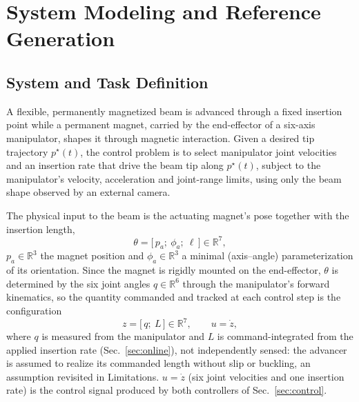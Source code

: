 \documentclass[journal]{IEEEtran}
\begin{document}
\section{System Modeling and Reference Generation}
\label{sec:system}

\subsection{System and Task Definition}
\label{sec:problem}

A flexible, permanently magnetized beam is advanced through a fixed
insertion point while a permanent magnet, carried by the end-effector of a
six-axis manipulator, shapes it through magnetic interaction. Given a
desired tip trajectory $p^\star(t)$, the control problem is to select
manipulator joint velocities and an insertion rate that drive the beam tip
along $p^\star(t)$, subject to the manipulator's velocity, acceleration
and joint-range limits, using only the beam shape observed by an external
camera.

The physical input to the beam is the actuating magnet's pose together
with the insertion length,
\begin{equation}
\theta = \big[\,p_a;\ \phi_a;\ \ell\,\big]\in\mathbb{R}^{7},
\label{eq:theta}
\end{equation}
$p_a\in\mathbb{R}^3$ the magnet position and $\phi_a\in\mathbb{R}^3$ a
minimal (axis--angle) parameterization of its orientation. Since the
magnet is rigidly mounted on the end-effector, $\theta$ is determined by
the six joint angles $q\in\mathbb{R}^6$ through the manipulator's forward
kinematics, so the quantity commanded and tracked at each control step is
the configuration
\begin{equation}
z = \big[\,q;\ L\,\big]\in\mathbb{R}^{7}, \qquad u=\dot z,
\label{eq:config}
\end{equation}
where $q$ is measured from the manipulator and $L$ is command-integrated
from the applied insertion rate (Sec.~\ref{sec:online}), not
independently sensed: the advancer is assumed to realize its commanded
length without slip or buckling, an assumption revisited in Limitations.
$u=\dot z$ (six joint velocities and one insertion rate) is the control
signal produced by both controllers of Sec.~\ref{sec:control}.
\end{document}
